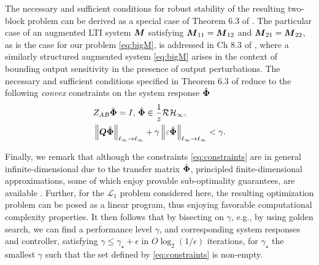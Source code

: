 The necessary and sufficient conditions for robust stability of the resulting two-block problem can be derived as a special case of Theorem 6.3 of \cite{khammash1990stability}.  The particular case of an  augmented LTI system $\boldsymbol{M}$ satisfying $\boldsymbol{M}_{11} = \boldsymbol{M}_{12}$ and $\boldsymbol{M}_{21} = \boldsymbol{M}_{22}$, as is the case for our problem \eqref{eq:bigM}, is addressed in Ch 8.3 of \cite{khammash1990stability}, where a similarly structured augmented system \eqref{eq:bigM} arises in the context of bounding output sensitivity in the presence of output perturbations.  The necessary and sufficient conditions specified in Theorem 6.3 of \cite{khammash1990stability} reduce to the following \emph{convex} constraints on the system response $\hat{\boldsymbol{\Phi}}$
\begin{equation} \label{eq:constraints}
\begin{aligned}
&Z_{AB}\hat{\boldsymbol{\Phi}} = I, \, \hat{\boldsymbol{\Phi}} \in \frac{1}{z}\mathcal{RH}_\infty, \\
& \left\|\boldsymbol{Q}\hat{\boldsymbol{\Phi}}\right\|_{\ell_\infty\to\ell_\infty} + \gamma\left\|\varepsilon\hat{\boldsymbol{\Phi}}\right\|_{\ell_\infty\to\ell_\infty} < \gamma.
\end{aligned}
\end{equation}

Finally, we remark that although the constraints \eqref{eq:constraints} are in general infinite-dimensional due to the transfer matrix $\hat{\boldsymbol{\Phi}}$, principled finite-dimensional approximations, some of which enjoy provable sub-optimality guarantees, are available \cite{matni2017scalable,anderson2019system,dean2017sample,dean2018regret}.  Further, for the $\mathcal{L}_1$ problem considered here, the resulting optimization problem can be posed as a linear program, thus enjoying favorable computational complexity properties.
It then follows that by bisecting on $\gamma$, e.g., by using golden search, we can find a performance level $\gamma$, and corresponding system responses and controller, satisfying $\gamma \leq \gamma_\star + \epsilon$ in $O\log_2(1/\epsilon)$ iterations, for $\gamma_\star$ the smallest $\gamma$ such that the set defined by \eqref{eq:constraints} is non-empty.


